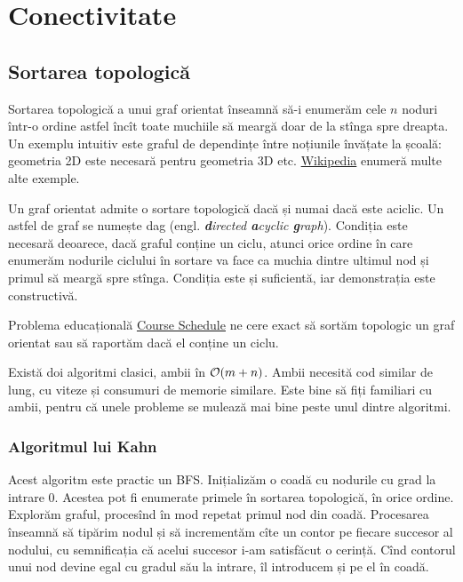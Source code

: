 \documentclass[../main.tex]{subfiles}
\begin{document}
\chapter{Conectivitate}
\label{chapter:connectivity}

\section{Sortarea topologică}

Sortarea topologică a unui graf orientat înseamnă să-i enumerăm cele $n$ noduri într-o ordine astfel încît toate muchiile să meargă doar de la stînga spre dreapta. Un exemplu intuitiv este graful de dependințe între noțiunile învățate la școală: geometria 2D este necesară pentru geometria 3D etc. \href{https://en.wikipedia.org/wiki/Topological_sorting}{Wikipedia} enumeră multe alte exemple.

Un graf orientat admite o sortare topologică dacă și numai dacă este aciclic. Un astfel de graf se numește dag (engl. \textit{\textbf{d}irected \textbf{a}cyclic \textbf{g}raph}). Condiția este necesară deoarece, dacă graful conține un ciclu, atunci orice ordine în care enumerăm nodurile ciclului în sortare va face ca muchia dintre ultimul nod și primul să meargă spre stînga. Condiția este și suficientă, iar demonstrația este constructivă.

Problema educațională \hyperref[problem:course-schedule]{Course Schedule} ne cere exact să sortăm topologic un graf orientat sau să raportăm dacă el conține un ciclu.

Există doi algoritmi clasici, ambii în $\mathcal{O}(m + n)$. Ambii necesită cod similar de lung, cu viteze și consumuri de memorie similare. Este bine să fiți familiari cu ambii, pentru că unele probleme se mulează mai bine peste unul dintre algoritmi.

\subsection{Algoritmul lui Kahn}

Acest algoritm este practic un BFS. Inițializăm o coadă cu nodurile cu grad la intrare 0. Acestea pot fi enumerate primele în sortarea topologică, în orice ordine. Explorăm graful, procesînd în mod repetat primul nod din coadă. Procesarea înseamnă să tipărim nodul și să incrementăm cîte un contor pe fiecare succesor al nodului, cu semnificația că acelui succesor i-am satisfăcut o cerință. Cînd contorul unui nod devine egal cu gradul său la intrare, îl introducem și pe el în coadă.
\end{document}
